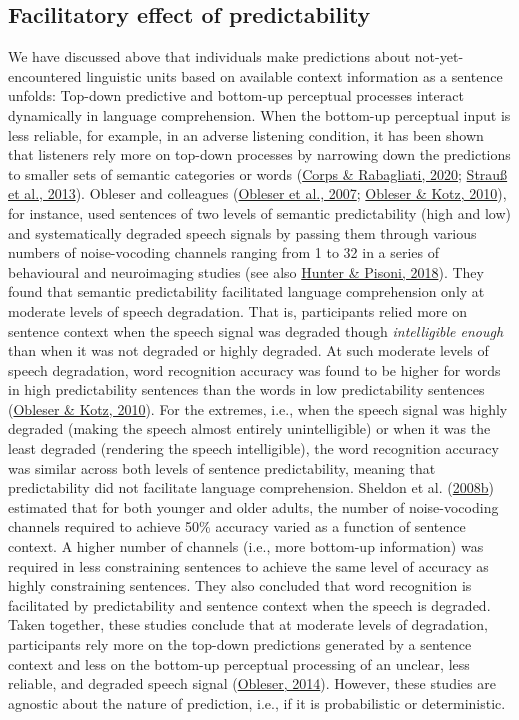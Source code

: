 \documentclass[a4paper, nobind]{templates/ociamthesis}
\begin{document}
\hypertarget{background-facilitatory-effect}{%
\subsection{Facilitatory effect of predictability}\label{background-facilitatory-effect}}

We have discussed above that individuals make predictions about not-yet-encountered linguistic units based on available context information as a sentence unfolds:
Top-down predictive and bottom-up perceptual processes interact dynamically in language comprehension.
When the bottom-up perceptual input is less reliable, for example, in an adverse listening condition, it has been shown that listeners rely more on top-down processes by narrowing down the predictions to smaller sets of semantic categories or words (\protect\hyperlink{ref-Corps2020}{Corps \& Rabagliati, 2020}; \protect\hyperlink{ref-Strauss2013}{Strauß et al., 2013}).
Obleser and colleagues (\protect\hyperlink{ref-Obleser2007}{Obleser et al., 2007}; \protect\hyperlink{ref-Obleser2010}{Obleser \& Kotz, 2010}), for instance, used sentences of two levels of semantic predictability (high and low) and systematically degraded speech signals by passing them through various numbers of noise-vocoding channels ranging from 1 to 32 in a series of behavioural and neuroimaging studies (see also \protect\hyperlink{ref-Hunter2018}{Hunter \& Pisoni, 2018}).
They found that semantic predictability facilitated language comprehension only at moderate levels of speech degradation.
That is, participants relied more on sentence context when the speech signal was degraded though \emph{intelligible enough} than when it was not degraded or highly degraded.
At such moderate levels of speech degradation, word recognition accuracy was found to be higher for words in high predictability sentences than the words in low predictability sentences (\protect\hyperlink{ref-Obleser2010}{Obleser \& Kotz, 2010}).
For the extremes, i.e., when the speech signal was highly degraded (making the speech almost entirely unintelligible) or when it was the least degraded (rendering the speech intelligible),
the word recognition accuracy was similar across both levels of sentence predictability, meaning that predictability did not facilitate language comprehension.
Sheldon et al. (\protect\hyperlink{ref-Sheldon2008b}{2008b}) estimated that for both younger and older adults, the number of noise-vocoding channels required to achieve 50\% accuracy varied as a function of sentence context.
A higher number of channels (i.e., more bottom-up information) was required in less constraining sentences to achieve the same level of accuracy as highly constraining sentences.
They also concluded that word recognition is facilitated by predictability and sentence context when the speech is degraded.
Taken together, these studies conclude that at moderate levels of degradation, participants rely more on the top-down predictions generated by a sentence context and less on the bottom-up perceptual processing of an unclear, less reliable, and degraded speech signal (\protect\hyperlink{ref-Obleser2014}{Obleser, 2014}).
However, these studies are agnostic about the nature of prediction, i.e., if it is probabilistic or deterministic.
\end{document}
